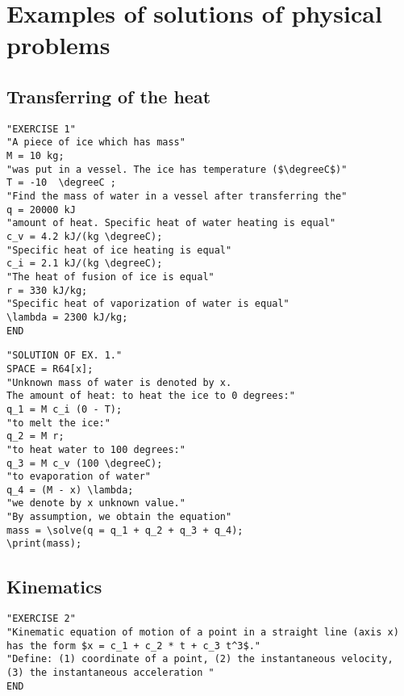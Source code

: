 
\chapter{ Examples of solutions of physical problems }

\section{Transferring of the  heat}
 
\begin{verbatim}
"EXERCISE 1"
"A piece of ice which has mass"
M = 10 kg;
"was put in a vessel. The ice has temperature ($\degreeC$)"
T = -10  \degreeC ;
"Find the mass of water in a vessel after transferring the"
q = 20000 kJ
"amount of heat. Specific heat of water heating is equal"
c_v = 4.2 kJ/(kg \degreeC);
"Specific heat of ice heating is equal"
c_i = 2.1 kJ/(kg \degreeC);
"The heat of fusion of ice is equal"
r = 330 kJ/kg;
"Specific heat of vaporization of water is equal"
\lambda = 2300 kJ/kg;
END
\end{verbatim}

\vspace*{-3mm}

\begin{verbatim}
"SOLUTION OF EX. 1."
SPACE = R64[x];
"Unknown mass of water is denoted by x.
The amount of heat: to heat the ice to 0 degrees:"
q_1 = M c_i (0 - T);
"to melt the ice:"
q_2 = M r;
"to heat water to 100 degrees:"
q_3 = M c_v (100 \degreeC);
"to evaporation of water"
q_4 = (M - x) \lambda;
"we denote by x unknown value."
"By assumption, we obtain the equation"
mass = \solve(q = q_1 + q_2 + q_3 + q_4); 
\print(mass);
\end{verbatim}

\vspace*{-3mm}

\section{Kinematics} 

\begin{verbatim}
"EXERCISE 2" 
"Kinematic equation of motion of a point in a straight line (axis x) 
has the form $x = c_1 + c_2 * t + c_3 t^3$."
"Define: (1) coordinate of a point, (2) the instantaneous velocity,
(3) the instantaneous acceleration "
END
\end{verbatim}

\vspace*{-3mm}

